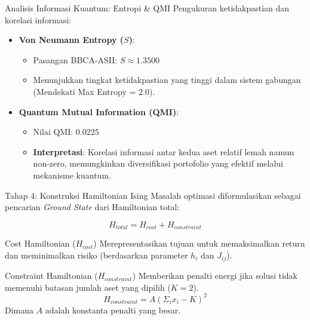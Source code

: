 \documentclass{beamer}
\begin{document}
\begin{frame}{Analisis Informasi Kuantum: Entropi \& QMI}
    Pengukuran ketidakpastian dan korelasi informasi:
    
    \begin{itemize}
        \item \textbf{Von Neumann Entropy ($S$)}:
        \begin{itemize}
            \item Pasangan BBCA-ASII: $S \approx 1.3500$
            \item Menunjukkan tingkat ketidakpastian yang tinggi dalam sistem gabungan (Mendekati Max Entropy = 2.0).
        \end{itemize}
        
        \vspace{0.3cm}
        \item \textbf{Quantum Mutual Information (QMI)}:
        \begin{itemize}
            \item Nilai QMI: $0.0225$
            \item \textbf{Interpretasi}: Korelasi informasi antar kedua aset relatif lemah namun non-zero, memungkinkan diversifikasi portofolio yang efektif melalui mekanisme kuantum.
        \end{itemize}
    \end{itemize}
\end{frame}

\begin{frame}{Tahap 4: Konstruksi Hamiltonian Ising}
    Masalah optimasi diformulasikan sebagai pencarian \textit{Ground State} dari Hamiltonian total:
    
    \[ H_{total} = H_{cost} + H_{constraint} \]
    
    \begin{block}{Cost Hamiltonian ($H_{cost}$)}
        Merepresentasikan tujuan untuk memaksimalkan return dan meminimalkan risiko (berdasarkan parameter $h_i$ dan $J_{ij}$).
    \end{block}
    
    \begin{block}{Constraint Hamiltonian ($H_{constraint}$)}
        Memberikan penalti energi jika solusi tidak memenuhi batasan jumlah aset yang dipilih ($K=2$).
        \[ H_{constraint} = A \left(\Sigma_{i} x_i - K\right)^2 \]
        Dimana $A$ adalah konstanta penalti yang besar.
    \end{block}
\end{frame}
\end{document}
